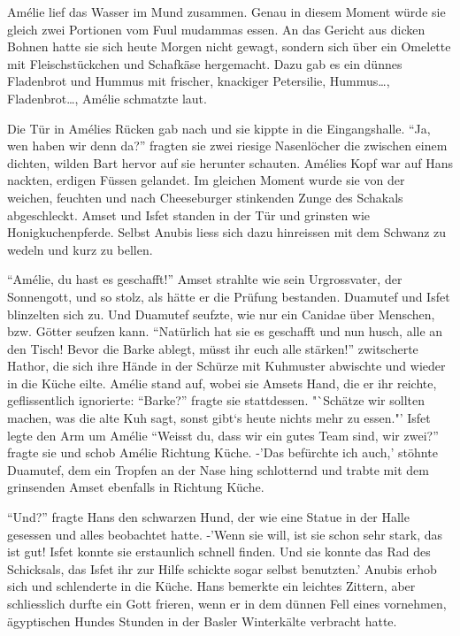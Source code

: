 \documentclass[11pt,titlepage,a5paper]{book}
\begin{document}
Amélie lief das Wasser im Mund zusammen. Genau in diesem Moment würde sie gleich zwei Portionen vom Fuul mudammas essen. An das Gericht aus dicken Bohnen hatte sie sich heute Morgen nicht gewagt, sondern sich über ein Omelette mit Fleischstückchen und Schafkäse hergemacht. Dazu gab es ein dünnes Fladenbrot und Hummus mit frischer, knackiger Petersilie, Hummus\dots, Fladenbrot\dots, Amélie schmatzte laut. 

Die Tür in Amélies Rücken gab nach und sie kippte in die Eingangshalle. "`Ja, wen haben wir denn da?"' fragten sie zwei riesige Nasenlöcher die zwischen einem dichten, wilden Bart hervor auf sie herunter schauten. Amélies Kopf war auf Hans nackten, erdigen Füssen gelandet. Im gleichen Moment wurde sie von der weichen, feuchten und nach Cheeseburger stinkenden Zunge des Schakals abgeschleckt. Amset und Isfet standen in der Tür und grinsten wie Honigkuchenpferde. Selbst Anubis liess sich dazu hinreissen mit dem Schwanz zu wedeln und kurz zu bellen.

"`Amélie, du hast es geschafft!"' Amset strahlte wie sein Urgrossvater, der Sonnengott, und so stolz, als hätte er die Prüfung bestanden. Duamutef und Isfet blinzelten sich zu. Und Duamutef seufzte, wie nur ein Canidae über Menschen, bzw. Götter seufzen kann. "`Natürlich hat sie es geschafft und nun husch, alle an den Tisch! Bevor die Barke ablegt, müsst ihr euch alle stärken!"' zwitscherte Hathor, die sich ihre Hände in der Schürze mit Kuhmuster abwischte und wieder in die Küche eilte. Amélie stand auf, wobei sie Amsets Hand, die er ihr reichte, geflissentlich ignorierte: "`Barke?"' fragte sie stattdessen. "`Schätze wir sollten machen, was die alte Kuh sagt, sonst gibt`s heute nichts mehr zu essen."' Isfet legte den Arm um Amélie "`Weisst du, dass wir ein gutes Team sind, wir zwei?"' fragte sie und schob Amélie Richtung Küche. -'Das befürchte ich auch,' stöhnte Duamutef, dem ein Tropfen an der Nase hing schlotternd und trabte mit dem grinsenden Amset ebenfalls in Richtung Küche.

"`Und?"' fragte Hans den schwarzen Hund, der wie eine Statue in der Halle gesessen und alles beobachtet hatte. -'Wenn sie will, ist sie schon sehr stark, das ist gut! Isfet konnte sie erstaunlich schnell finden. Und sie konnte das Rad des Schicksals, das Isfet ihr zur Hilfe schickte sogar selbst benutzten.' Anubis erhob sich und schlenderte in die Küche. Hans bemerkte ein leichtes Zittern, aber schliesslich durfte ein Gott frieren, wenn er in dem dünnen Fell eines vornehmen, ägyptischen Hundes Stunden in der Basler Winterkälte verbracht hatte.
\end{document}
